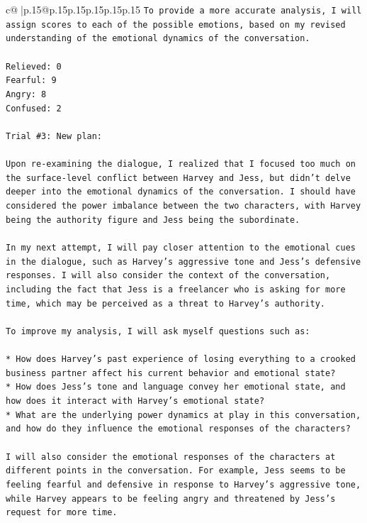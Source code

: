 \documentclass{article}
\begin{document}
{\begin{supertabular}{c@{$\;$}|p{.15\linewidth}@{}p{.15\linewidth}p{.15\linewidth}p{.15\linewidth}p{.15\linewidth}p{.15\linewidth}}
{{{\texttt{To provide a more accurate analysis, I will assign scores to each of the possible emotions, based on my revised understanding of the emotional dynamics of the conversation.} \\
\\ 
\texttt{Relieved: 0} \\
\texttt{Fearful: 9} \\
\texttt{Angry: 8} \\
\texttt{Confused: 2} \\
\\ 
\texttt{Trial \#3: New plan: } \\
\\ 
\texttt{Upon re{-}examining the dialogue, I realized that I focused too much on the surface{-}level conflict between Harvey and Jess, but didn't delve deeper into the emotional dynamics of the conversation. I should have considered the power imbalance between the two characters, with Harvey being the authority figure and Jess being the subordinate. } \\
\\ 
\texttt{In my next attempt, I will pay closer attention to the emotional cues in the dialogue, such as Harvey's aggressive tone and Jess's defensive responses. I will also consider the context of the conversation, including the fact that Jess is a freelancer who is asking for more time, which may be perceived as a threat to Harvey's authority.} \\
\\ 
\texttt{To improve my analysis, I will ask myself questions such as:} \\
\\ 
\texttt{* How does Harvey's past experience of losing everything to a crooked business partner affect his current behavior and emotional state?} \\
\texttt{* How does Jess's tone and language convey her emotional state, and how does it interact with Harvey's emotional state?} \\
\texttt{* What are the underlying power dynamics at play in this conversation, and how do they influence the emotional responses of the characters?} \\
\\ 
\texttt{I will also consider the emotional responses of the characters at different points in the conversation. For example, Jess seems to be feeling fearful and defensive in response to Harvey's aggressive tone, while Harvey appears to be feeling angry and threatened by Jess's request for more time.} \\
}}}
\end{supertabular}}
\end{document}

